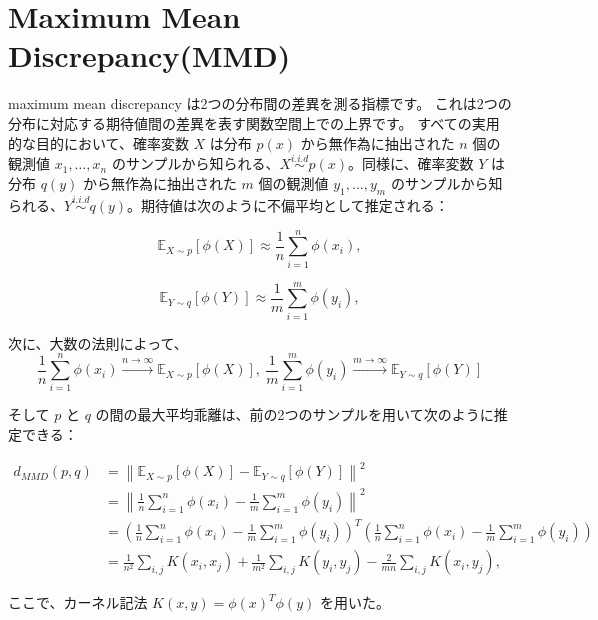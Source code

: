 \documentclass[dvipdfmx,a4paper]{jsarticle}%
\begin{document}
\section{\textbf{Maximum Mean Discrepancy(MMD)}}
\begin{dfn}\label{def:mmd}
  maximum mean discrepancy は2つの分布間の差異を測る指標です。 これは2つの分布に対応する期待値間の差異を表す関数空間上での上界です。
すべての実用的な目的において、確率変数 $X$ は分布 $p(x)$ から無作為に抽出された $n$ 個の観測値 $x_1, \ldots, x_n$ のサンプルから知られる、$X\stackrel{i.i.d}{\sim}p(x)$。同様に、確率変数 $Y$ は分布 $q(y)$ から無作為に抽出された $m$ 個の観測値 $y_1, \ldots, y_m$ のサンプルから知られる、$Y\stackrel{i.i.d}{\sim}q(y)$。期待値は次のように不偏平均として推定される：

$$\mathbb{E}_{X \sim p}[\phi(X)] \approx \frac{1}{n} \sum_{i=1}^n \phi(x_i),$$

$$\mathbb{E}_{Y \sim q}[\phi(Y)] \approx \frac{1}{m} \sum_{i=1}^m \phi(y_i),$$

次に、大数の法則によって、
 $$ \frac{1}{n} \sum_{i=1}^{n} \phi(x_i) \xrightarrow{n \to \infty} \mathbb{E}_{X \sim p}[\phi(X)],\ \frac{1}{m} \sum_{i=1}^{m} \phi(y_i) \xrightarrow{m \to \infty} \mathbb{E}_{Y \sim q}[\phi(Y)] $$

そして $p$ と $q$ の間の最大平均乖離は、前の2つのサンプルを用いて次のように推定できる：

\begin{align*}
d_{MMD}(p, q) &= \left\|\mathbb{E}_{X \sim p}[\phi(X)] - \mathbb{E}_{Y \sim q}[\phi(Y)]\right\|^2 \\
&= \left\|\frac{1}{n} \sum_{i=1}^n \phi(x_i) - \frac{1}{m} \sum_{i=1}^m \phi(y_i)\right\|^2 \\
&= \left(\frac{1}{n} \sum_{i=1}^n \phi(x_i) - \frac{1}{m} \sum_{i=1}^m \phi(y_i)\right)^T \left(\frac{1}{n} \sum_{i=1}^n \phi(x_i) - \frac{1}{m} \sum_{i=1}^m \phi(y_i)\right) \\
&= \frac{1}{n^2} \sum_{i,j} K(x_i, x_j) + \frac{1}{m^2} \sum_{i,j} K(y_i, y_j) - \frac{2}{mn} \sum_{i,j} K(x_i, y_j), 
\end{align*}

ここで、カーネル記法 $K(x, y) = \phi(x)^T \phi(y)$ を用いた。
\end{dfn}
\appendix

\end{document}
